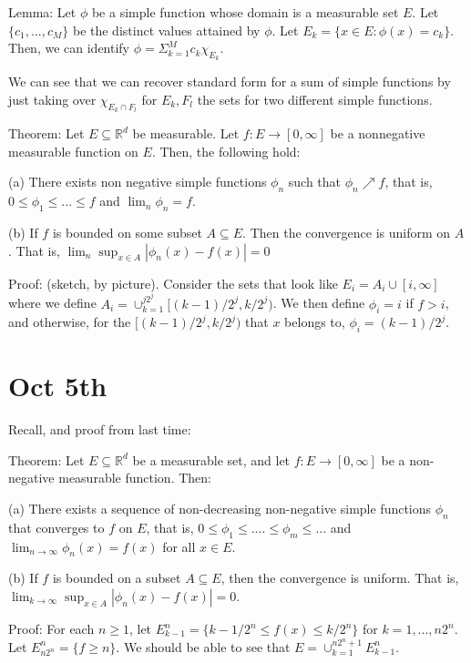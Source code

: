 \documentclass[10pt]{article}
\begin{document}
Lemma: Let $\phi$ be a simple function whose domain is a measurable set $E$. Let $\{ c_1,...,c_M \} $ be the distinct values attained by $\phi$. Let $E_k = \{ x \in E : \phi(x) = c_k \}$. Then, we can identify $\phi = \Sigma_{k=1}^M c_k \chi_{E_k}$.

We can see that we can recover standard form for a sum of simple functions by just taking over $\chi_{E_k \cap F_l}$ for $E_k, F_l$ the sets for two different simple functions.

Theorem: Let $ E \subseteq \mathbb{R}^d$ be measurable. Let $f : E \to [0,\infty]$ be a nonnegative measurable function on $E$. Then, the following hold:

(a) There exists non negative simple functions $\phi_n$ such that $\phi_n \nearrow f$, that is, $0 \leq \phi_1 \leq ...\leq f$ and $\lim_n \phi_n = f$.

(b) If $f$ is bounded on some subset $A \subseteq E$. Then the convergence is uniform on $A$. That is, $\lim_n \sup_{ x \in A} | \phi_n(x) - f(x) | = 0$

Proof: (sketch, by picture). Consider the sets that look like $E_i = A_i \cup [i,\infty]$ where we define $A_i = \cup_{k=1}^{j2^j} [ (k-1)/2^j, k/2^j )$. We then define $\phi_i = i $ if $f > i$, and otherwise, for the $ [ (k-1)/2^j, k/2^j )$ that $x$ belongs to, $\phi_i = (k-1)/2^j$.

\section*{Oct 5th}

Recall, and proof from last time:

Theorem: Let $E \subseteq \mathbb{R}^d$ be a measurable set, and let $f: E \to [0,\infty]$ be a non-negative measurable function. Then:

(a) There exists a sequence of non-decreasing non-negative simple functions $\phi_n$ that converges to $f$ on $E$, that is, $0 \leq \phi_1 \leq .... \leq \phi_m \leq ...$ and $\lim_{n\to \infty} \phi_n(x) = f(x)$ for all $x \in E$.

(b) If $f$ is bounded on a subset $A \subseteq E$, then the convergence is uniform. That is, $\lim_{k\to \infty} \sup_{x \in A} | \phi_n(x) - f(x) | = 0$.

Proof: For each $ n \geq 1$, let $E_{k-1}^n = \{ k-1/2^n \leq f(x) \leq k/ 2^n \}$ for $k = 1,...,n2^n$. Let $E^n_{n2^n} = \{ f \geq n \}$. We should be able to see that $E = \cup_{k = 1}^{n2^n + 1} E_{k-1}^n$. 
\end{document}
